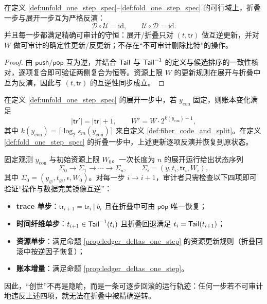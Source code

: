 \begin{proposition}[完美镜像互逆与守恒]\label{prop:perfect_inverse_and_conservation}
在定义 \ref{def:unfold_one_step_spec}--\ref{def:fold_one_step_spec} 的可行域上，折叠一步与展开一步互为严格反演：
$$
\mathcal D\circ \mathcal U = \mathrm{id},\qquad \mathcal U\circ \mathcal D = \mathrm{id}.
$$
并且每一步都满足精确可审计的守恒：展开/折叠只对 \((t,\mathsf{tr})\) 做互逆更新，并对 \(W\) 做可审计的确定性更新/反更新；不存在“不可审计删除比特”的操作。
\end{proposition}

\begin{proof}
由 \(\mathsf{push}/\mathsf{pop}\) 互为逆，并结合 \(\mathsf{Tail}\) 与 \(\mathsf{Tail}^{-1}\) 的定义与候选排序的一致性核对，逐项复合即可验证两侧复合为恒等。资源上限 \(W\) 的更新规则在展开与折叠中互为反演，因此与 \((t,\mathsf{tr})\) 的互逆性同步成立。
\end{proof}

\begin{proposition}\label{prop:ledger_deltas_one_step}
在定义 \ref{def:unfold_one_step_spec} 的展开一步中，若 \(y_{\mathrm{con}}\) 固定，则账本变化满足
$$
|\mathsf{tr}'|=|\mathsf{tr}|+1,\qquad
W'=W\cdot 2^{k(y_{\mathrm{con}})-1},
$$
其中 \(k(y_{\mathrm{con}})=\lceil\log_2 s_m(y_{\mathrm{con}})\rceil\) 来自定义 \ref{def:fiber_code_and_split}。在定义 \ref{def:fold_one_step_spec} 的折叠一步中，上述更新逐项反演并恢复到原状态。
\end{proposition}

\begin{remark}[“像运行日志一样读创世过程”】【模板】]\label{rem:genesis_runlog_template}
固定观测 \(y_{\mathrm{con}}\) 与初始资源上限 \(W_0\)。一次长度为 \(n\) 的展开运行给出状态序列
$$
\Sigma_0\to \Sigma_1\to \cdots\to \Sigma_n,\qquad
\Sigma_i=(y,t_i,\mathsf{tr}_i,W_i),
$$
其中 \(\Sigma_0=(y_{\varnothing},t_{\varnothing},\epsilon,W_0)\)。对每一步 \(i\to i+1\)，审计者只需检查以下四项即可验证“操作与数据完美镜像互逆”：
\begin{itemize}
  \item \textbf{trace 单步}：\(\mathsf{tr}_{i+1}=\mathsf{tr}_i\,\Vert\, b_i\) 且在折叠中可由 \(\mathsf{pop}\) 唯一恢复；
  \item \textbf{时间纤维单步}：\(t_{i+1}\in \mathsf{Tail}^{-1}(t_i)\) 且折叠回退满足 \(t_i=\mathsf{Tail}(t_{i+1})\)；
  \item \textbf{资源单步}：满足命题 \ref{prop:ledger_deltas_one_step} 的资源更新规则（折叠回滚中按逆因子恢复）；
  \item \textbf{账本增量}：满足命题 \ref{prop:ledger_deltas_one_step}。
\end{itemize}
因此，“创世”不再是隐喻，而是一条可逐步回滚的运行轨迹：任何一步若不可审计地违反上述四项，就无法在折叠中被精确逆转。
\end{remark}

